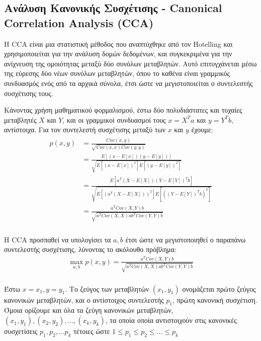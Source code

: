 \documentclass[11pt,a4paper,english,greek,twoside]{../Thesis}
\begin{document}
\subsection{Ανάλυση Κανονικής Συσχέτισης - Canonical Correlation Analysis (CCA)}

\par Η CCA είναι μια στατιστική μέθοδος που αναπτύχθηκε από τον Hotelling \cite{Hotelling1936-vk} και χρησιμοποιείται για την ανάλυση δομών δεδομένων, και συγκεκριμένα για την ανίχνευση της ομοιότητας μεταξύ δύο συνόλων μεταβλητών. Αυτό επιτυγχάνεται μέσω της εύρεσης δύο νέων συνόλων μεταβλητών, όπου το καθένα είναι γραμμικός συνδυασμός ενός από τα αρχικά σύνολα, έτσι ώστε να μεγιστοποιείται ο συντελεστής συσχέτισης τους. 
\par Κάνοντας χρήση μαθηματικού φορμαλισμού, έστω δύο πολυδιάστατες και τυχαίες μεταβλητές $X$ και $Y$, και οι γραμμικοί συνδυασμοί τους $x=X^Ta$ και $y=Y^Tb$, αντίστοιχα. Για τον συντελεστή συσχέτισης μεταξύ των $x$ και $y$ έχουμε:
\begin{align}
\begin{split} %
p(x,y)&=\frac{Cov(x,y)}{\sqrt{Cov(x,x)Cov(y,y)}} \\[2ex]
&=\frac{E[(x-E[x])(y-E[y])]}{\sqrt{E[(x-E[x])^2]E[(y-E[y])^2]}} \\[2ex]
&=\frac{E[a^T(X-E[X])(Y-E[Y])^Tb]}{\sqrt{E[(a^T(X-E[X]))^2]E[((Y-E[Y])^Tb)^2]}} \\[2ex]
&=\frac{a^TCov(X,Y)b}{\sqrt{a^TCov(X,X)ab^TCov(Y,Y)b}} \\
\label{eqCCA1}
\end{split}
\end{align}

\par H CCA προσπαθεί να υπολογίσει τα $a, b$ έτσι ώστε να μεγιστοποιηθεί ο παραπάνω συντελεστής συσχέτισης, λύνοντας το ακόλουθο πρόβλημα:
\begin{align}
\max_{a,b}p(x,y)=\frac{a^TCov(X,Y)b}{\sqrt{a^TCov(X,X)ab^TCov(Y,Y)b}} \\
\label{eqCCA2}
\end{align}

\par Έστω $x=x_1,y=y_1$. Το ζεύγος των μεταβλητών $(x_1, y_1)$ ονομάζεται πρώτο ζεύγος κανονικών μεταβλητών, και ο αντίστοιχος συντελεστής $p_1$, πρώτη κανονική συσχέτιση. Όμοια ορίζουμε και όλα τα ζεύγη κανονικών μεταβλητών, $(x_1,y_1),(x_2,y_2),...,(x_k,y_k)$, τα οποία οποία αντιστοιχούν στις κανονικές συσχετίσεις $p_1,p_2,...p_k$ τέτοιες ώστε $1\leq p_1\leq p_2\leq ... \leq p_k$
\end{document}

